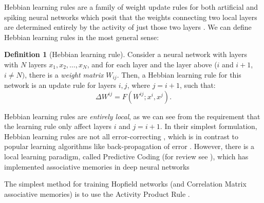 \documentclass{article}
\theoremstyle{definition}
\newtheorem{definition}{Definition}[subsection]
\begin{document}
Hebbian learning rules are a family of weight update rules for both
artificial and spiking neural networks which posit that
the weights connecting two local layers are determined entirely
by the activity of just those two layers
\parencites{hebb_organization_1949,sejnowski_hebb_1989}.
We can define Hebbian learning rules in the most general sense:
\begin{definition}[Hebbian learning rule]\label{def:hebbian-learning-rule}
  Consider a neural network with layers with $N$ layers $x_{1}, x_2,
  \dots, x_N$,
  and for each layer and the layer above ($i$ and $i + 1$, $i \neq N)$, there
  is a \textit{weight matrix} $W_{ij}$. Then, a Hebbian learning rule for this
  network is an update rule for layers $i, j$, where $j = i + 1$, such that:
  \begin{equation}
    \Delta W^{ij} = F(W^{ij}; x^i, x^j).
  \end{equation}
\end{definition}

Hebbian learning rules are \textit{entirely local}, as we can see from
the requirement that the learning rule only affect layers $i$ and $j = i + 1$.
In their simplest formulation, Hebbian learning rules are not
all error-correcting \parencite{munakata_how_2006},
which is in contrast to popular learning algorithms
like back-propagation of error \parencite{rumelhart_learning_1986}. However,
there is a local learning paradigm, called Predictive Coding (for review see
\textcite{spratling_review_2017}), which
has implemented associative memories in deep neural networks
\parencite{salvatori_associative_2021}

The simplest method for training Hopfield networks (and Correlation
  Matrix associative
memories) is to use the Activity Product Rule \parencite{haykin_neural_2009}.
\end{document}

